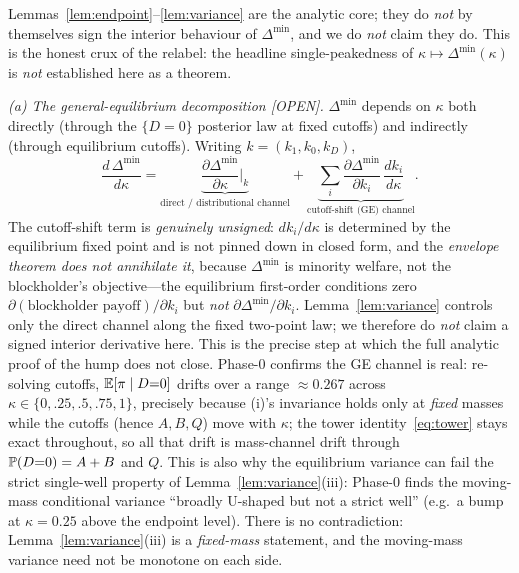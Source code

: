 \begin{remark}\label{rem:decomp}
Lemmas~\ref{lem:endpoint}--\ref{lem:variance} are the analytic core; they do
\emph{not} by themselves sign the interior behaviour of $\Delta^{\min}$, and we
do \emph{not} claim they do. This is the honest crux of the relabel: the
headline single-peakedness of $\kappa\mapsto\Delta^{\min}(\kappa)$ is
\emph{not} established here as a theorem.

\emph{(a) The general-equilibrium decomposition \textnormal{[OPEN]}.}
$\Delta^{\min}$ depends on $\kappa$ both directly (through the $\{D=0\}$ posterior
law at fixed cutoffs) and indirectly (through equilibrium cutoffs). Writing
$k=(k_1,k_0,k_D)$,
\begin{equation}\label{eq:GEdecomp}
   \frac{d\,\Delta^{\min}}{d\kappa}
   =\underbrace{\frac{\partial\Delta^{\min}}{\partial\kappa}\Big|_{k}}
     _{\text{direct / distributional channel}}
   +\underbrace{\sum_{i}\frac{\partial\Delta^{\min}}{\partial k_i}\,
                \frac{dk_i}{d\kappa}}_{\text{cutoff-shift (GE) channel}} .
\end{equation}
The cutoff-shift term is \emph{genuinely unsigned}: $dk_i/d\kappa$ is determined by
the equilibrium fixed point and is not pinned down in closed form, and the
\emph{envelope theorem does not annihilate it}, because $\Delta^{\min}$ is minority
welfare, not the blockholder's objective---the equilibrium first-order conditions
zero $\partial(\text{blockholder payoff})/\partial k_i$ but \emph{not}
$\partial\Delta^{\min}/\partial k_i$. Lemma~\ref{lem:variance} controls only the
direct channel along the fixed two-point law; we therefore do \emph{not} claim a
signed interior derivative here. This is the precise step at which the full
analytic proof of the hump does not close. Phase-0 confirms the GE channel is
real: re-solving cutoffs, $\mathbb{E}[\pi\mid D{=}0]$ drifts over a range
$\approx0.267$ across $\kappa\in\{0,.25,.5,.75,1\}$, precisely because (i)'s
invariance holds only at \emph{fixed} masses while the cutoffs (hence $A,B,Q$)
move with $\kappa$; the tower identity~\eqref{eq:tower} stays exact throughout, so
all that drift is mass-channel drift through $\mathbb{P}(D{=}0)=A+B$ and $Q$. This is
also why the equilibrium variance can fail the strict single-well property of
Lemma~\ref{lem:variance}(iii): Phase-0 finds the moving-mass conditional variance
``broadly U-shaped but not a strict well'' (e.g.\ a bump at $\kappa=0.25$ above
the endpoint level). There is no contradiction: Lemma~\ref{lem:variance}(iii) is a
\emph{fixed-mass} statement, and the moving-mass variance need not be monotone on
each side.


\end{remark}
